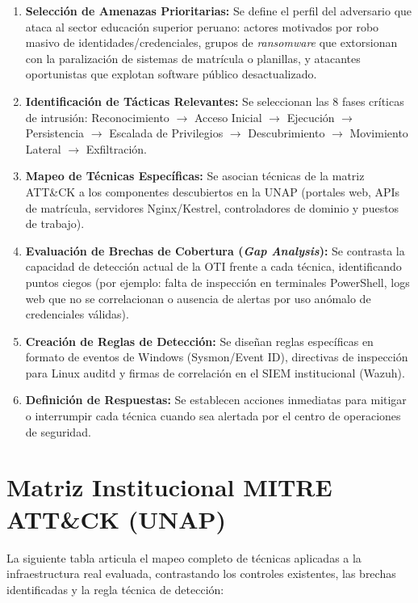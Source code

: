 \begin{enumerate}
    \item \textbf{Selección de Amenazas Prioritarias:} Se define el perfil del adversario que ataca al sector educación superior peruano: actores motivados por robo masivo de identidades/credenciales, grupos de \textit{ransomware} que extorsionan con la paralización de sistemas de matrícula o planillas, y atacantes oportunistas que explotan software público desactualizado.
    \item \textbf{Identificación de Tácticas Relevantes:} Se seleccionan las 8 fases críticas de intrusión: Reconocimiento $\rightarrow$ Acceso Inicial $\rightarrow$ Ejecución $\rightarrow$ Persistencia $\rightarrow$ Escalada de Privilegios $\rightarrow$ Descubrimiento $\rightarrow$ Movimiento Lateral $\rightarrow$ Exfiltración.
    \item \textbf{Mapeo de Técnicas Específicas:} Se asocian técnicas de la matriz ATT\&CK a los componentes descubiertos en la UNAP (portales web, APIs de matrícula, servidores Nginx/Kestrel, controladores de dominio y puestos de trabajo).
    \item \textbf{Evaluación de Brechas de Cobertura (\textit{Gap Analysis}):} Se contrasta la capacidad de detección actual de la OTI frente a cada técnica, identificando puntos ciegos (por ejemplo: falta de inspección en terminales PowerShell, logs web que no se correlacionan o ausencia de alertas por uso anómalo de credenciales válidas).
    \item \textbf{Creación de Reglas de Detección:} Se diseñan reglas específicas en formato de eventos de Windows (Sysmon/Event ID), directivas de inspección para Linux auditd y firmas de correlación en el SIEM institucional (Wazuh).
    \item \textbf{Definición de Respuestas:} Se establecen acciones inmediatas para mitigar o interrumpir cada técnica cuando sea alertada por el centro de operaciones de seguridad.
\end{enumerate}

\section{Matriz Institucional MITRE ATT\&CK (UNAP)}

La siguiente tabla articula el mapeo completo de técnicas aplicadas a la infraestructura real evaluada, contrastando los controles existentes, las brechas identificadas y la regla técnica de detección:

